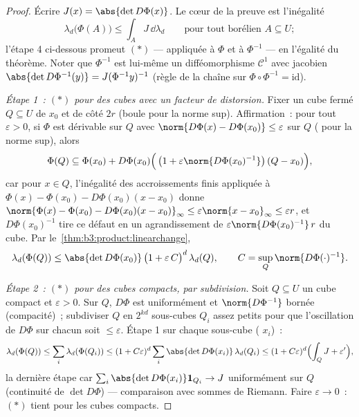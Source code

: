\begin{proof}
Écrire $J(x) = \abs{\det D\Phi(x)}$. Le cœur de la preuve est
l'inégalité
\[
\lambda_d\bigl(\Phi(A)\bigr) \leq \int_A J\,\dd\lambda_d
\qquad\text{pour tout borélien } A \subseteq U;
\tag{$*$}
\]
l'étape 4 ci-dessous promeut $(*)$ --- appliquée à $\Phi$ et
à $\Phi^{-1}$ --- en l'égalité du théorème. Noter que
$\Phi^{-1}$ est lui-même un difféomorphisme $\mathcal C^1$
avec jacobien $\abs{\det D\Phi^{-1}(y)} = J(\Phi^{-1}y)^{-1}$
(règle de la chaîne sur $\Phi\circ\Phi^{-1} = \mathrm{id}$).

\emph{Étape 1~: $(*)$ pour des cubes avec un facteur de
distorsion.} Fixer un cube fermé $Q \subseteq U$ de 
$x_0$ et de côté $2r$ (boule pour la norme sup). Affirmation~:
pour tout $\varepsilon > 0$, si $\Phi$ est dérivable sur $Q$
avec $\norm{D\Phi(x) - D\Phi(x_0)} \leq \varepsilon$ sur $Q$
( pour la norme sup), alors
\[
\Phi(Q) \subseteq \Phi(x_0) + D\Phi(x_0)\Bigl(\,\bigl(1 +
\varepsilon\norm{D\Phi(x_0)^{-1}}\bigr)\,(Q - x_0)\Bigr),
\]
car pour $x \in Q$, l'inégalité des accroissements finis
appliquée à $\Phi(x) - \Phi(x_0) - D\Phi(x_0)(x - x_0)$ donne
$\norm{\Phi(x) - \Phi(x_0) - D\Phi(x_0)(x-x_0)}_\infty \leq
\varepsilon\norm{x - x_0}_\infty \leq \varepsilon r$, et
$D\Phi(x_0)^{-1}$ tire ce défaut en un agrandissement de
$\varepsilon\norm{D\Phi(x_0)^{-1}}\,r$ du cube. Par
le~\cref{thm:b3:product:linearchange},
\[
\lambda_d(\Phi(Q)) \leq \abs{\det D\Phi(x_0)}\,
\bigl(1 + \varepsilon\,C\bigr)^{d}\,\lambda_d(Q),
\qquad C = \sup_{Q}\norm{D\Phi(\cdot)^{-1}} .
\]

\emph{Étape 2~: $(*)$ pour des cubes compacts, par
subdivision.} Soit $Q \subseteq U$ un cube compact et
$\varepsilon > 0$. Sur $Q$, $D\Phi$ est uniformément 
et $\norm{D\Phi^{-1}}$ bornée (compacité)~; subdiviser $Q$
en $2^{kd}$ sous-cubes $Q_i$ assez petits pour que
l'oscillation de $D\Phi$ sur chacun soit $\leq \varepsilon$.
Étape 1 sur chaque sous-cube ( $x_i$)~:
\[
\lambda_d(\Phi(Q)) \leq \sum_i\lambda_d(\Phi(Q_i))
\leq (1 + C\varepsilon)^d \sum_i \abs{\det
D\Phi(x_i)}\,\lambda_d(Q_i)
\leq (1 + C\varepsilon)^d\Bigl(\int_Q J + \varepsilon'\Bigr),
\]
la dernière étape car $\sum_i\abs{\det D\Phi(x_i)}\mathbf
1_{Q_i} \to J$ uniformément sur $Q$ (continuité de $\det
D\Phi$) --- comparaison avec sommes de Riemann. Faire
$\varepsilon \to 0$~: $(*)$ tient pour les cubes compacts.


\end{proof}
